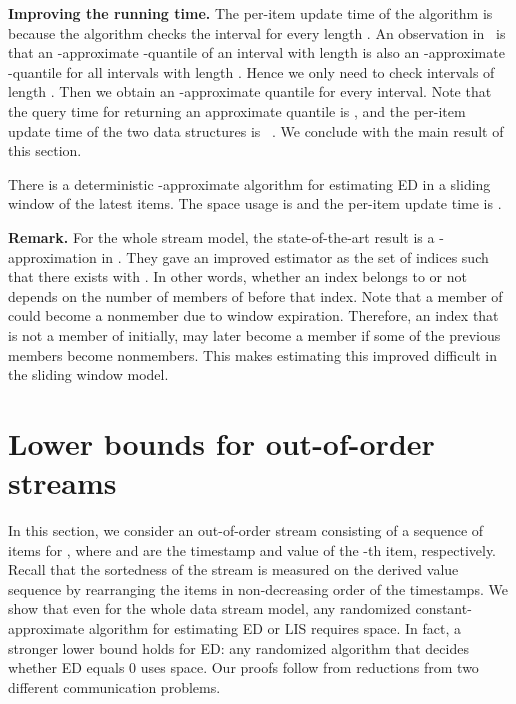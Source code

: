 \documentclass{llncs}
\newcommand{\runtitle}[1]{{\small \textbf{\boldmath #1}}}
\begin{document}
\vspace{.1in}
\runtitle{Improving the running time.}  The per-item update time of the algorithm is 
because the algorithm checks the interval  for every length .
An observation in~\cite{ErJ08} is that an -approximate
-quantile of an interval with length  is also an -approximate -quantile
for all intervals with length . Hence we only need to check
 intervals of length .
Then we obtain an
-approximate quantile for every interval.
Note that the query time for returning an approximate quantile
is ,
and the per-item update time of the two data structures is
~\cite{CKT08,LLX+04}.
We conclude with the main result of this section.



\begin{theorem}
There is a deterministic -approximate algorithm
for estimating ED in a sliding window of the latest  items.
The space usage is 
and the per-item update time is
.
\end{theorem}

\runtitle{Remark.} For the whole stream model, the state-of-the-art result is a
-approximation in \cite{ErJ08}.  They gave an improved estimator
 as the set
of indices  such that there exists  with . In other words, whether an index belongs to  or not
depends on the number of members of  before that index.  Note that
a member of  could become a nonmember due to window expiration.  Therefore, an
index  that is not a member of  initially, may later become a member
if some of the previous  members become nonmembers.  This makes estimating
this improved  difficult in the sliding window model.

\section{Lower bounds for out-of-order streams}\label{sec:extensions}

In this section, we consider an out-of-order stream 
consisting of a sequence of items  for ,
where  and  are the timestamp and
value of the -th item, respectively.
Recall that the sortedness of the stream is
measured on the derived value sequence by rearranging the items in
non-decreasing order of the timestamps. 
We show that even for the whole data stream model,
any randomized constant-approximate algorithm
for estimating ED or LIS requires  space. 
In fact, a stronger lower bound holds for ED: any randomized algorithm that decides 
whether ED equals 0 uses  space.  Our proofs follow from reductions from
two different communication problems.
\end{document}
